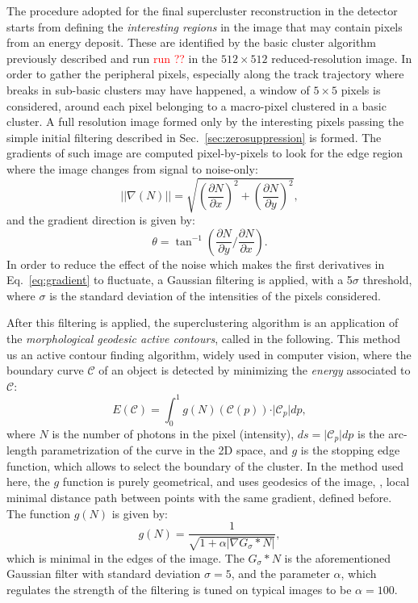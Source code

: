 The procedure adopted for the final supercluster reconstruction in the
\lemon detector starts from defining the \textit{interesting regions}
in the image that may contain pixels from an energy deposit. These are
identified by the basic cluster algorithm \idbscan previously
described and run  \textcolor{red}{run ??} in the $512\times512$ reduced-resolution image. In
order to gather the peripheral pixels, especially along the track
trajectory where breaks in sub-basic clusters may have happened, a
window of $5\times5$ pixels is considered, around each pixel belonging
to a macro-pixel clustered in a basic cluster. A full resolution image
formed only by the interesting pixels passing the simple initial
filtering described in Sec.~\ref{sec:zerosuppression} is formed.  The
gradients of such image are computed pixel-by-pixels to look for the
edge region where the image changes from signal to noise-only:
\begin{equation}
\label{eq:gradient}
\vert\vert\nabla(N)\vert\vert =
\sqrt{\left(\frac{\partial N}{\partial x}\right)^2
  +\left(\frac{\partial N}{\partial y}\right)^2},
\end{equation}
and the gradient direction is given by:
\begin{equation}
  \label{eq:graddir}
  \theta = \tan^{-1}\left(\frac{\partial N}{\partial y}/\frac{\partial N}{\partial x}\right).
\end{equation}
In order to reduce the effect of the noise which makes the first
derivatives in Eq.~\ref{eq:gradient} to fluctuate, a Gaussian
filtering is applied, with a 5$\sigma$ threshold, where $\sigma$ is
the standard deviation of the intensities of the pixels considered.

After this filtering is applied, the superclustering algorithm is an
application of the \textit{morphological geodesic active
  contours}\cite{gac,mgac}, called \gac in the following.  This method
us an active contour finding algorithm, widely used in computer
vision, where the boundary curve $\mathcal{C}$ of an object is
detected by minimizing the \textit{energy} associated to $\mathcal{C}$:
\begin{equation}
  \label{eq:gacenergy}
  E(\mathcal{C}) = \int_{0}^{1} g(N)(\mathcal{C}(p)) \cdot \vert\mathcal{C}_p\vert dp,
\end{equation}
where $N$ is the number of photons in the pixel (intensity), $ds=
\vert\mathcal{C}_p\vert dp$ is the arc-length parametrization of the
curve in the 2D space, and $g$ is the stopping edge function, which
allows to select the boundary of the cluster.  In the \gac method used
here, the $g$ function is purely geometrical, and uses geodesics of
the image, \ie, local minimal distance path between points with the
same gradient, defined before. The function $g(N)$ is given by:
\begin{equation}
g(N) = \frac{1}{\sqrt{1+\alpha\vert\nabla G_\sigma * N\vert}},
\end{equation}
which is minimal in the edges of the image.  The
$G_\sigma * N$ is the aforementioned Gaussian filter with standard
deviation $\sigma=5$, and the parameter $\alpha$, which regulates the
strength of the filtering is tuned on typical \lemon images to be
$\alpha=100$.

